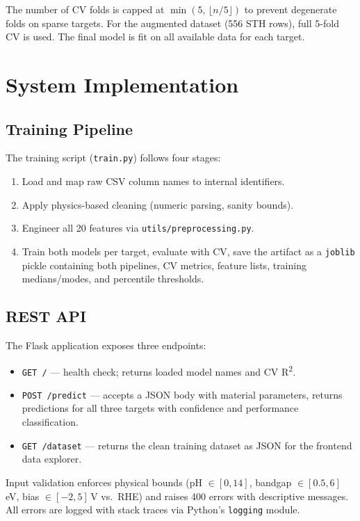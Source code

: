 The number of CV folds is capped at $\min(5,\,\lfloor n/5 \rfloor)$ to prevent
degenerate folds on sparse targets.
For the augmented dataset (556 STH rows), full 5-fold CV is used.
The final model is fit on all available data for each target.

\section{System Implementation}

\subsection{Training Pipeline}

The training script (\texttt{train.py}) follows four stages:
\begin{enumerate}
  \item Load and map raw CSV column names to internal identifiers.
  \item Apply physics-based cleaning (numeric parsing, sanity bounds).
  \item Engineer all 20 features via \texttt{utils/preprocessing.py}.
  \item Train both models per target, evaluate with CV, save the artifact
        as a \texttt{joblib} pickle containing both pipelines,
        CV metrics, feature lists, training medians/modes, and
        percentile thresholds.
\end{enumerate}

\subsection{REST API}

The Flask application exposes three endpoints:
\begin{itemize}
  \item \texttt{GET /} — health check; returns loaded model names and CV R\textsuperscript{2}.
  \item \texttt{POST /predict} — accepts a JSON body with material parameters,
        returns predictions for all three targets with confidence and
        performance classification.
  \item \texttt{GET /dataset} — returns the clean training dataset as JSON
        for the frontend data explorer.
\end{itemize}

Input validation enforces physical bounds (pH $\in [0,14]$, bandgap $\in [0.5,6]$\,eV,
bias $\in [-2,5]$\,V vs.\ RHE) and raises 400 errors with descriptive messages.
All errors are logged with stack traces via Python's \texttt{logging} module.

